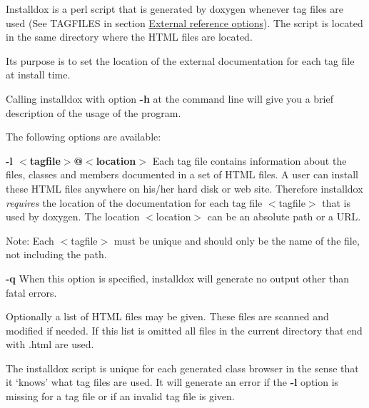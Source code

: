 Installdox is a perl script that is generated by doxygen whenever tag files are used (See {\ttfamily TAGFILES} in section \hyperlink{config_config_extref}{External reference options}). The script is located in the same directory where the HTML files are located.

Its purpose is to set the location of the external documentation for each tag file at install time.

Calling {\ttfamily installdox} with option {\bfseries -\/h} at the command line will give you a brief description of the usage of the program.

The following options are available: 
\begin{DoxyDescription}
\item[{\bfseries -\/l {\ttfamily $<$tagfile$>$@$<$location$>$}}]Each tag file contains information about the files, classes and members documented in a set of HTML files. A user can install these HTML files anywhere on his/her hard disk or web site. Therefore installdox {\itshape requires\/} the location of the documentation for each tag file {\ttfamily $<$tagfile$>$} that is used by doxygen. The location {\ttfamily $<$location$>$} can be an absolute path or a URL.

\begin{DoxyParagraph}{Note:}
Each $<$tagfile$>$ must be unique and should only be the name of the file, not including the path.
\end{DoxyParagraph}

\item[{\bfseries -\/q}]When this option is specified, installdox will generate no output other than fatal errors. 
\end{DoxyDescription}Optionally a list of HTML files may be given. These files are scanned and modified if needed. If this list is omitted all files in the current directory that end with {\ttfamily }.html are used.

The {\ttfamily installdox} script is unique for each generated class browser in the sense that it `knows' what tag files are used. It will generate an error if the {\bfseries -\/l} option is missing for a tag file or if an invalid tag file is given. 